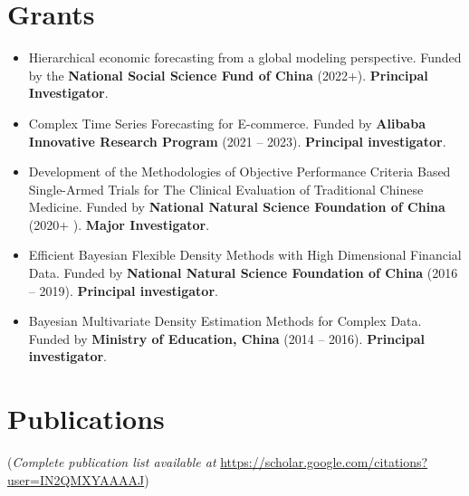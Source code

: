 \documentclass[twoside,a4paper]{article}
\begin{document}
\section*{Grants}
\begin{itemize}
\item Hierarchical economic forecasting from a global modeling perspective. Funded by the \textbf{National Social Science Fund of China} (2022+). \textbf{Principal Investigator}.

\item Complex Time Series Forecasting for E-commerce. Funded by \textbf{Alibaba Innovative Research Program} (2021 -- 2023). \textbf{Principal investigator}.

\item Development of the Methodologies of Objective Performance Criteria Based Single-Armed Trials for The Clinical Evaluation of Traditional Chinese Medicine. Funded by \textbf{National Natural Science Foundation of China} (2020+  ). \textbf{Major Investigator}.

\item Efficient Bayesian Flexible Density Methods with High Dimensional Financial Data. Funded by \textbf{National Natural Science Foundation of China} (2016 -- 2019). \textbf{Principal investigator}.

\item Bayesian Multivariate Density Estimation Methods for Complex Data. Funded by \textbf{Ministry of Education, China} (2014 -- 2016). \textbf{Principal investigator}.

\end{itemize}

\section*{Publications}

(\emph{Complete publication list available at}
  \url{https://scholar.google.com/citations?user=IN2QMXYAAAAJ})
\end{document}
